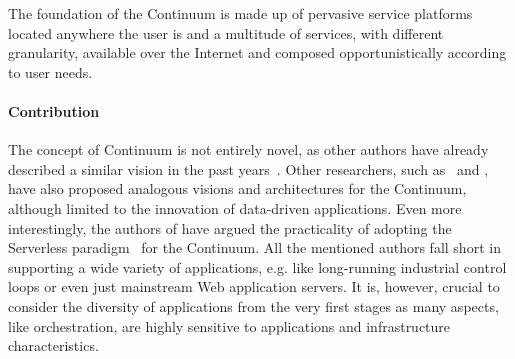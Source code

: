 The foundation of the Continuum is made up of pervasive service platforms located anywhere the user is and a multitude of services, with different granularity, available over the Internet and composed opportunistically according to user needs.


\paragraph{Contribution}

The concept of Continuum is not entirely novel, as other authors have already described a similar vision in the past years~\cite{balouek2019towards, beckman2020harnessing}. Other researchers, such as~\cite{abdelbaky2017computing} and \cite{balouek2019towards}, have also proposed analogous visions and architectures for the Continuum, although limited to the innovation of data-driven applications. Even more interestingly, the authors of \cite{risco2021serverless} have argued the practicality of adopting the Serverless paradigm~\cite{shafiei2022serverless} for the Continuum. All the mentioned authors fall short in supporting a wide variety of applications, e.g. like long-running industrial control loops or even just mainstream Web application servers. It is, however, crucial to consider the diversity of applications from the very first stages as many aspects, like orchestration, are highly sensitive to applications and infrastructure characteristics.

